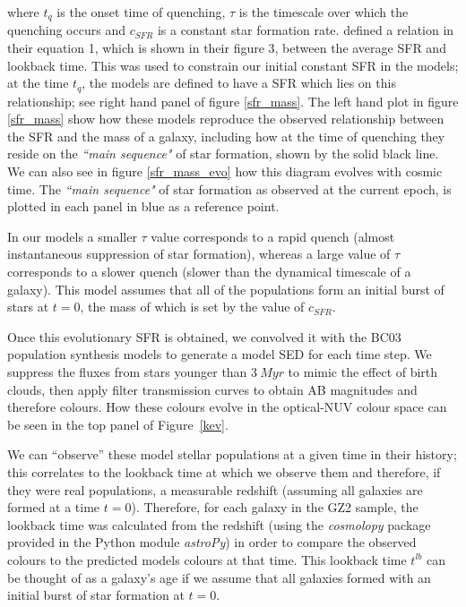 \documentclass{mn2e}
\begin{document}
where $t_{q}$ is the onset time of quenching, $\tau$ is the timescale over which the quenching occurs and $c_{SFR}$ is a constant star formation rate. \citet{Peng} defined a relation in their equation 1, which is shown in their figure 3, between the average SFR and lookback time. This was used to constrain our initial constant SFR in the models; at the time $t_{q}$, the models are defined to have a SFR which lies on this relationship; see right hand panel of figure \ref{sfr_mass}. The left hand plot in figure \ref{sfr_mass} show how these models reproduce the observed relationship between the SFR and the mass of a galaxy, including how at the time of quenching they reside on the \emph{``main sequence"} of star formation, shown by the solid black line. We can also see in figure \ref{sfr_mass_evo} how this diagram evolves with cosmic time. The \emph{``main sequence"} of star formation as observed at the current epoch, is plotted in each panel in blue as a reference point. 

In our models a smaller $\tau$ value corresponds to a rapid quench (almost instantaneous suppression of star formation), whereas a large value of $\tau$ corresponds to a slower quench (slower than the dynamical timescale of a galaxy).  This model assumes that all of the populations form an initial burst of stars at $t=0$, the mass of which is set by the value of $c_{SFR}$. %

Once this evolutionary SFR is obtained, we convolved it with the BC03 population synthesis models to generate a model SED for each time step. We suppress the fluxes from stars younger than $3~Myr$ to mimic the effect of birth clouds, then apply filter transmission curves to obtain AB magnitudes and therefore colours. How these colours evolve in the optical-NUV colour space can be seen in the top panel of Figure~\ref{kev}.


We can ``observe'' these model stellar populations at a given time in their history; this correlates to the lookback time at which we observe them and therefore, if they were real populations, a measurable redshift (assuming all galaxies are formed at a time $t=0$). Therefore, for each galaxy in the GZ2 sample, the lookback time was calculated from the redshift (using the \emph{cosmolopy} package provided in the Python module \emph{astroPy}) in order to compare the observed colours to the predicted models colours at that time. This lookback time $t^{lb}$ can be thought of as a galaxy's age if we assume that all galaxies formed with an initial burst of star formation at $t=0$. 
\end{document}

